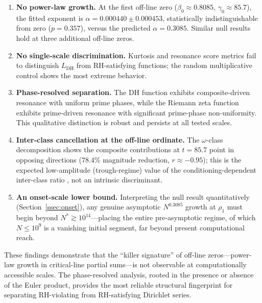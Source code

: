 \documentclass[11pt]{amsart}
\theoremstyle{definition}
\theoremstyle{remark}
\renewcommand{\DH}{\mathrm{DH}}
\begin{document}
\begin{enumerate}
\item \textbf{No power-law growth.}  At the first off-line zero
  ($\beta_0 \approx 0.8085$, $\gamma_0 \approx 85.7$), the fitted
  exponent is $\alpha = 0.000440 \pm 0.000453$, statistically
  indistinguishable from zero ($p = 0.357$), versus the predicted
  $\alpha = 0.3085$.  Similar null results hold at three additional
  off-line zeros.

\item \textbf{No single-scale discrimination.}  Kurtosis and resonance
  score metrics fail to distinguish $L_{\DH}$ from RH-satisfying
  functions; the random multiplicative control shows the most extreme
  behavior.

\item \textbf{Phase-resolved separation.}  The DH function exhibits
  composite-driven resonance with uniform prime phases, while the
  Riemann zeta function exhibits prime-driven resonance with
  significant prime-phase non-uniformity.  This qualitative
  distinction is robust and persists at all tested scales.

\item \textbf{Inter-class cancellation at the off-line ordinate.}  The
  $\omega$-class decomposition shows the composite contributions at
  $t=85.7$ point in opposing directions ($78.4\%$ magnitude reduction,
  $r\approx-0.95$); this is the expected low-amplitude (trough-regime)
  value of the conditioning-dependent inter-class ratio
  \cite{TrejoSignNote}, not an intrinsic discriminant.

\item \textbf{An onset-scale lower bound.}  Interpreting the null result
  quantitatively (Section~\ref{ssec:onset}), any genuine asymptotic
  $N^{0.3085}$ growth at $\rho_1$ must begin beyond
  $N^* \gtrsim 10^{14}$---placing the entire pre-asymptotic regime, of
  which $N\le10^9$ is a vanishing initial segment, far beyond present
  computational reach.
\end{enumerate}

These findings demonstrate that the ``killer signature'' of off-line
zeros---power-law growth in critical-line partial sums---is not
observable at computationally accessible scales.  The phase-resolved
analysis, rooted in the presence or absence of the Euler product,
provides the most reliable structural fingerprint for separating
RH-violating from RH-satisfying Dirichlet series.
\end{document}
